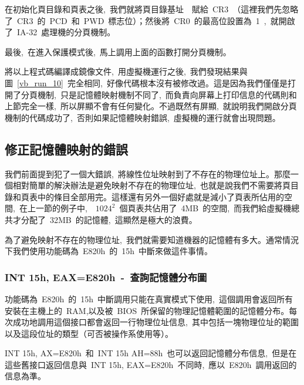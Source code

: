 在初始化頁目錄和頁表之後,~我們就將頁目錄基址~~賦給~CR3~（這裡我們先忽略了~CR3~的~PCD~和~PWD~標志位）；然後將~CR0~的最高位設置為~1~,~就開啟了~IA-32~處理機的分頁機制。

最後,~在進入保護模式後,~馬上調用上面的函數打開分頁機制。


將以上程式碼編譯成鏡像文件,~用虛擬機運行之後,~我們發現結果與圖~\ref{vb_run_10}~完全相同,~好像代碼根本沒有被修改過。這是因為我們僅僅是打開了分頁機制,~只是記憶體映射機制不同了,~而負責向屏幕上打印信息的代碼則和上節完全一樣,~所以屏顯不會有任何變化。不過既然有屏顯,~就說明我們開啟分頁機制的代碼成功了,~否則如果記憶體映射錯誤,~虛擬機的運行就會出現問題。

\subsection{修正記憶體映射的錯誤}

我們前面提到犯了一個大錯誤,~將線性位址映射到了不存在的物理位址上。那麼一個相對簡單的解決辦法是避免映射不存在的物理位址,~也就是說我們不需要將頁目錄和頁表中的條目全部用完。這樣還有另外一個好處就是減小了頁表所佔用的空間,~在上一節的例子中,~~$1024^2$~個頁表共佔用了~4MB~的空間,~而我們給虛擬機總共才分配了~32MB~的記憶體,~這顯然是極大的浪費。

為了避免映射不存在的物理位址,~我們就需要知道機器的記憶體有多大。通常情況下我們使用功能碼為~E820h~的~15h~中斷來做這件事情。

\subsubsection{INT 15h, EAX=E820h~-~查詢記憶體分布圖}

功能碼為~E820h~的~15h~中斷調用只能在真實模式下使用,~這個調用會返回所有安裝在主機上的~RAM,以及被~BIOS~所保留的物理記憶體範圍的記憶體分布。每次成功地調用這個接口都會返回一行物理位址信息,~其中包括一塊物理位址的範圍以及這段位址的類型（可否被操作系使用等）。

INT 15h, AX=E820h~和~INT 15h AH=88h~也可以返回記憶體分布信息,~但是在這些舊接口返回信息與~INT 15h, EAX=E820h~不同時,~應以~E820h~調用返回的信息為準。

